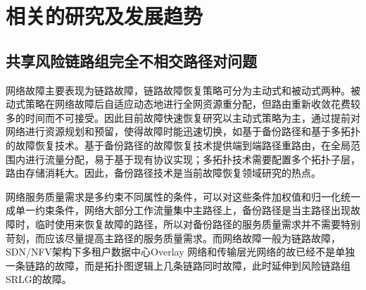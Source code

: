 \section{相关的研究及发展趋势}
\subsection{共享风险链路组完全不相交路径对问题}
网络故障主要表现为链路故障，链路故障恢复策略可分为主动式和被动式两种\cite{kvalbein2006fast,qi2012research}。被动式策略在网络故障后自适应动态地进行全网资源重分配，但路由重新收敛花费较多的时间而不可接受。因此目前故障快速恢复研究以主动式策略为主，通过提前对网络进行资源规划和预留，使得故障时能迅速切换，如基于备份路径和基于多拓扑\cite{shand2010ip}的故障恢复技术。基于备份路径的故障恢复技术提供端到端路径重路由，在全局范围内进行流量分配，易于基于现有协议实现；多拓扑技术需要配置多个拓扑子层，路由存储消耗大。因此，备份路径技术是当前故障恢复领域研究的热点\cite{yang2014keep,wang2010r3,banner2010designing,suchara2011network,zheng2014cross}。

网络服务质量需求是多约束不同属性的条件，可以对这些条件加权值和归一化统一成单一约束条件，网络大部分工作流量集中主路径上，备份路径是当主路径出现故障时，临时使用来恢复故障的路径，所以对备份路径的服务质量需求并不需要特别苛刻，而应该尽量提高主路径的服务质量需求。而网络故障一般为链路故障，SDN/NFV架构下多租户数据中心Overlay 网络和传输层光网络的故已经不是单独一条链路的故障，而是拓扑图逻辑上几条链路同时故障，此时延伸到风险链路组SRLG的故障。

